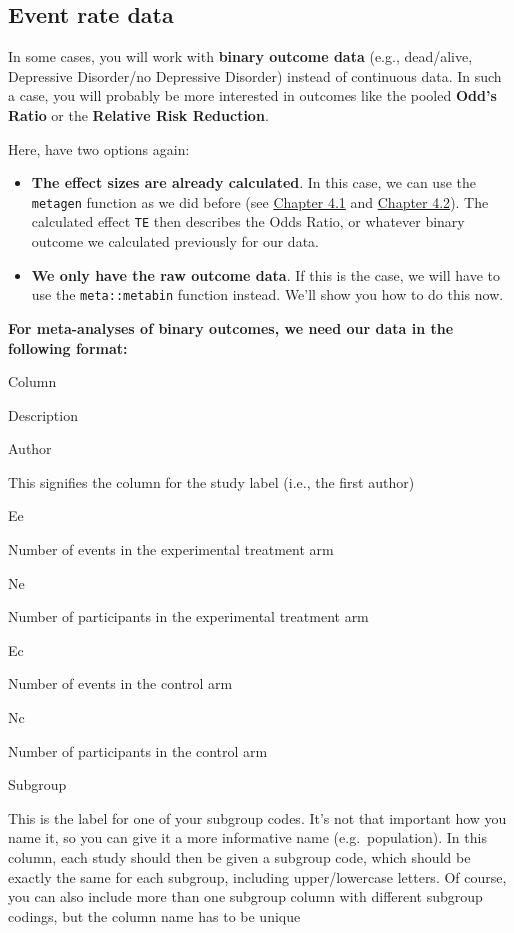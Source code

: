 \documentclass[]{book}
\providecommand{\tightlist}{%
  \setlength{\itemsep}{0pt}\setlength{\parskip}{0pt}}
\begin{document}
\hypertarget{event-rate-data}{%
\subsection{Event rate data}\label{event-rate-data}}

In some cases, you will work with \textbf{binary outcome data} (e.g., dead/alive, Depressive Disorder/no Depressive Disorder) instead of continuous data. In such a case, you will probably be more interested in outcomes like the pooled \textbf{Odd's Ratio} or the \textbf{Relative Risk Reduction}.

Here, have two options again:

\begin{itemize}
\tightlist
\item
  \textbf{The effect sizes are already calculated}. In this case, we can use the \texttt{metagen} function as we did before (see \protect\hyperlink{fixed}{Chapter 4.1} and \protect\hyperlink{random}{Chapter 4.2}). The calculated effect \texttt{TE} then describes the Odds Ratio, or whatever binary outcome we calculated previously for our data.
\item
  \textbf{We only have the raw outcome data}. If this is the case, we will have to use the \texttt{meta::metabin} function instead. We'll show you how to do this now.
\end{itemize}

\textbf{For meta-analyses of binary outcomes, we need our data in the following format:}

Column

Description

Author

This signifies the column for the study label (i.e., the first author)

Ee

Number of events in the experimental treatment arm

Ne

Number of participants in the experimental treatment arm

Ec

Number of events in the control arm

Nc

Number of participants in the control arm

Subgroup

This is the label for one of your subgroup codes. It's not that important how you name it, so you can give it a more informative name (e.g.~population). In this column, each study should then be given a subgroup code, which should be exactly the same for each subgroup, including upper/lowercase letters. Of course, you can also include more than one subgroup column with different subgroup codings, but the column name has to be unique
\end{document}
